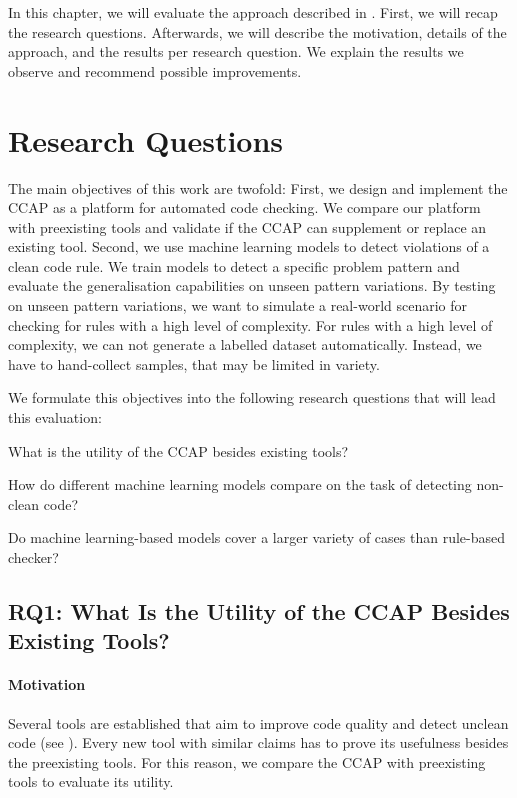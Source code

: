 In this chapter, we will evaluate the approach described in . First, we will recap the research questions. Afterwards, we will describe the motivation, details of the approach, and the results per research question. We explain the results we observe and recommend possible improvements.

\section{Research Questions}
The main objectives of this work are twofold: First, we design and implement the CCAP as a platform for automated code checking. We compare our platform with preexisting tools and validate if the CCAP can supplement or replace an existing tool. 
Second, we use machine learning models to detect violations of a clean code rule. We train models to detect a specific problem pattern and evaluate the generalisation capabilities on unseen pattern variations. By testing on unseen pattern variations, we want to simulate a real-world scenario for checking for rules with a high level of complexity. For rules with a high level of complexity, we can not generate a labelled dataset automatically. Instead, we have to hand-collect samples, that may be limited in variety.

We formulate this objectives into the following research questions that will lead this evaluation:
\begin{description}
    \setlength{\itemsep}{1pt}
    \item[RQ1:] What is the utility of the CCAP besides existing tools? 
    \item[RQ2:] How do different machine learning models compare on the task of detecting non-clean code?
    \item[RQ3:] Do machine learning-based models cover a larger variety of cases than rule-based checker? 
\end{description}

\subsection{RQ1: What Is the Utility of the CCAP Besides Existing Tools?}\label{rq:1}
\paragraph{Motivation}
Several tools are established that aim to improve code quality and detect unclean code (see ). Every new tool with similar claims has to prove its usefulness besides the preexisting tools. For this reason, we compare the CCAP with preexisting tools to evaluate its utility.

